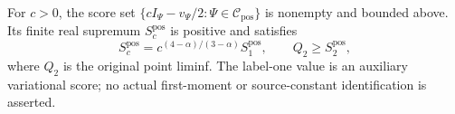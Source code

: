 \begin{proposition}
  \label{P:variational-positive-scores}
  For $c>0$, the score set
  $\{cI_\Psi-v_\Psi/2:\Psi\in\mathcal C_{\mathrm{pos}}\}$
  is nonempty and bounded above. Its finite real supremum
  $S_c^{\mathrm{pos}}$ is positive and satisfies
  \begin{equation}\label{E:variational-score-homogeneity}
    S_c^{\mathrm{pos}}=c^{(4-\alpha)/(3-\alpha)}S_1^{\mathrm{pos}},
    \qquad
    Q_2\ge S_2^{\mathrm{pos}},
  \end{equation}
  where $Q_2$ is the original point liminf.
  The label-one value is an auxiliary variational score; no actual
  first-moment or source-constant identification is asserted.
\end{proposition}

